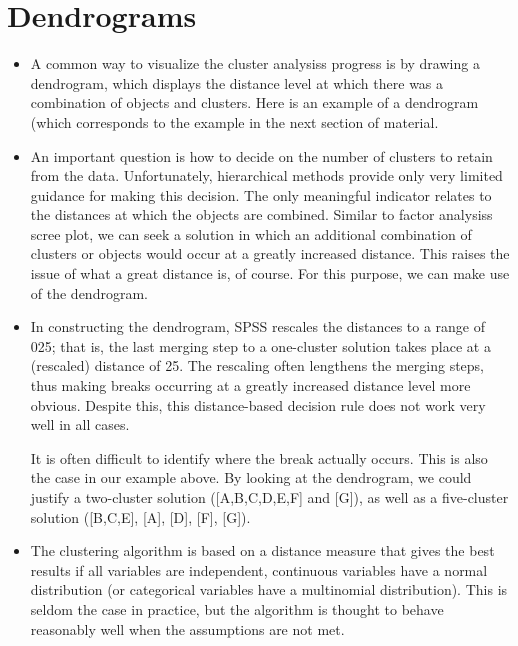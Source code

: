 \documentclass[a4paper,12pt]{article}
\begin{document}
\section{Dendrograms}
\begin{itemize}

\item A common way to visualize the cluster analysiss progress is by drawing a
dendrogram, which displays the distance level at which there was a combination
of objects and clusters.
Here is an example of a dendrogram (which corresponds to the example in the next section of material.



\item An important question is how to decide on the number of
clusters to retain from the data. Unfortunately, hierarchical methods provide only
very limited guidance for making this decision. The only meaningful indicator
relates to the distances at which the objects are combined. Similar to factor
analysiss scree plot, we can seek a solution in which an additional combination
of clusters or objects would occur at a greatly increased distance. This raises the
issue of what a great distance is, of course. For this purpose, we can make use of the dendrogram.

\item In constructing the dendrogram, SPSS rescales the distances to a range of 025; that is, the last merging step to a one-cluster solution takes place at a
(rescaled) distance of 25. The rescaling often lengthens the merging steps, thus
making breaks occurring at a greatly increased distance level more obvious. Despite this, this distance-based decision rule does not work very well in all
cases.

It is often difficult to identify where the break actually occurs. This is also
the case in our example above. By looking at the dendrogram, we could justify
a two-cluster solution ([A,B,C,D,E,F] and [G]), as well as a five-cluster solution
([B,C,E], [A], [D], [F], [G]).


\item 
The clustering algorithm is based on a distance measure that gives the best results if all variables are independent, continuous variables have a normal distribution (or categorical variables have a multinomial distribution). This is seldom the case in practice, but the algorithm is thought to behave reasonably well when the assumptions are not met.


\end{itemize}
\end{document}

